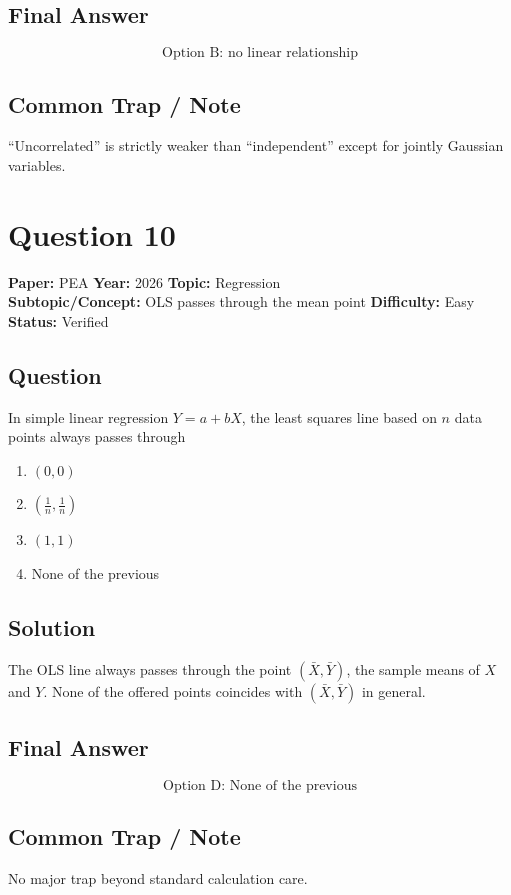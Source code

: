 \documentclass[11pt]{article}
\begin{document}
\subsection*{Final Answer}
\[
\boxed{\text{Option B: no linear relationship}}
\]

\subsection*{Common Trap / Note}
``Uncorrelated'' is strictly weaker than ``independent'' except for jointly Gaussian variables.

\section*{Question 10}
\textbf{Paper:} PEA \quad \textbf{Year:} 2026 \quad \textbf{Topic:} Regression \\
\textbf{Subtopic/Concept:} OLS passes through the mean point \quad
\textbf{Difficulty:} Easy \quad \textbf{Status:} Verified

\subsection*{Question}
In simple linear regression $Y = a + bX$, the least squares line based on $n$ data points always passes through
\begin{enumerate}[label=(\Alph*)]
\item $(0,0)$
\item $\left(\tfrac{1}{n}, \tfrac{1}{n}\right)$
\item $(1,1)$
\item None of the previous
\end{enumerate}

\subsection*{Solution}
The OLS line always passes through the point $(\bar{X}, \bar{Y})$, the sample means
of $X$ and $Y$. None of the offered points coincides with $(\bar{X}, \bar{Y})$ in general.

\subsection*{Final Answer}
\[
\boxed{\text{Option D: None of the previous}}
\]

\subsection*{Common Trap / Note}
No major trap beyond standard calculation care.
\end{document}
